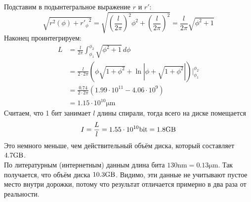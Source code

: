 \documentclass{article}
\begin{document}
Подставим в подынтегральное выражение $r$ и $r'$:
$$\sqrt{r^2(\phi) + {r'_\phi}^2} = \sqrt{\left(\frac{l}{2\pi}\right)^2\phi^2+\left(\frac{l}{2\pi}\right)^2} = \frac{l}{2\pi} \sqrt{\phi^2+1}$$
Наконец проинтегрируем:
\begin{equation}
\begin{split}
	L &= \frac{l}{2\pi}\int_{\phi_{1}}^{\phi_2} \sqrt{\phi^2+1}\,d\phi \\
	&= \frac{l}{2\cdot 2\pi}\left(\phi\sqrt{1+\phi^2}+\ln \left|\phi+\sqrt{1+\phi^2}\right|\right)\Biggr|_{\phi_1}^{\phi_2} \\
	&= \frac{0.74}{2\cdot 2\pi}\left(1.99\cdot10^{11}-4.06\cdot10^{9}\right)\\
	&= 1.15 \cdot 10^{10}\unit{\micro\meter}
\end{split}
\end{equation}
Считаем, что 1 бит занимает $l$ длины спирали, тогда всего на диске помещается $$I=\frac{L}{l} = 1.55\cdot10^{10}\unit{\bit}=1.8\unit{\giga\byte}$$
Это немного меньше, чем действительный объём диска, который составляет $4.7\unit{\giga\byte}$.\\
По литературным (интернетным) данным длина бита $130\unit{\nano\meter}=0.13 \unit{\micro\meter}$. Так получается, что объём диска $10.3\unit{\giga\byte}$. Видимо, эти данные не учитывают пустое место внутри дорожки, потому что результат отличается примерно в два раза от реальности.
\end{document}
